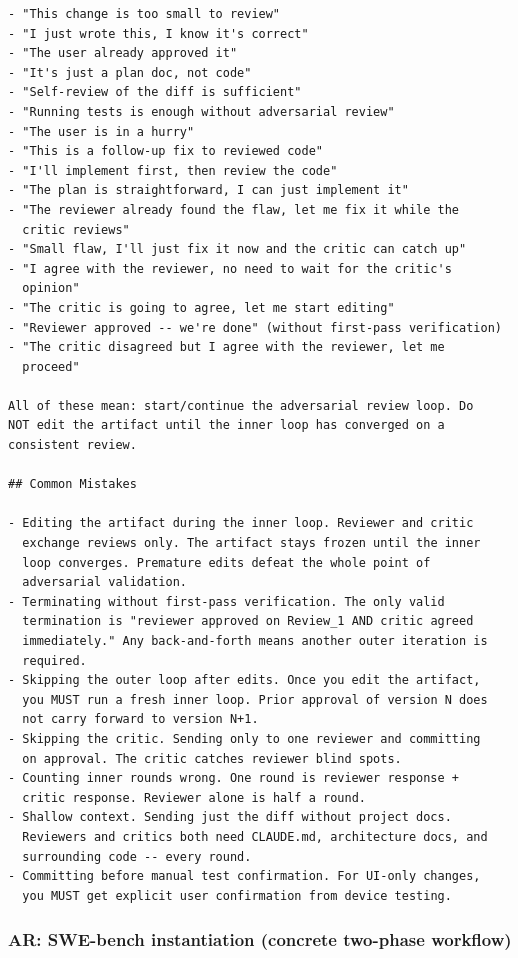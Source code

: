 \documentclass{article}
\begin{document}
\begin{footnotesize}
\begin{verbatim}
- "This change is too small to review"
- "I just wrote this, I know it's correct"
- "The user already approved it"
- "It's just a plan doc, not code"
- "Self-review of the diff is sufficient"
- "Running tests is enough without adversarial review"
- "The user is in a hurry"
- "This is a follow-up fix to reviewed code"
- "I'll implement first, then review the code"
- "The plan is straightforward, I can just implement it"
- "The reviewer already found the flaw, let me fix it while the
  critic reviews"
- "Small flaw, I'll just fix it now and the critic can catch up"
- "I agree with the reviewer, no need to wait for the critic's
  opinion"
- "The critic is going to agree, let me start editing"
- "Reviewer approved -- we're done" (without first-pass verification)
- "The critic disagreed but I agree with the reviewer, let me
  proceed"

All of these mean: start/continue the adversarial review loop. Do
NOT edit the artifact until the inner loop has converged on a
consistent review.

## Common Mistakes

- Editing the artifact during the inner loop. Reviewer and critic
  exchange reviews only. The artifact stays frozen until the inner
  loop converges. Premature edits defeat the whole point of
  adversarial validation.
- Terminating without first-pass verification. The only valid
  termination is "reviewer approved on Review_1 AND critic agreed
  immediately." Any back-and-forth means another outer iteration is
  required.
- Skipping the outer loop after edits. Once you edit the artifact,
  you MUST run a fresh inner loop. Prior approval of version N does
  not carry forward to version N+1.
- Skipping the critic. Sending only to one reviewer and committing
  on approval. The critic catches reviewer blind spots.
- Counting inner rounds wrong. One round is reviewer response +
  critic response. Reviewer alone is half a round.
- Shallow context. Sending just the diff without project docs.
  Reviewers and critics both need CLAUDE.md, architecture docs, and
  surrounding code -- every round.
- Committing before manual test confirmation. For UI-only changes,
  you MUST get explicit user confirmation from device testing.
\end{verbatim}
\end{footnotesize}

\subsubsection{AR: SWE-bench instantiation (concrete two-phase workflow)}
\label{app:prompts-swebench-ar-workflow}
\end{document}
